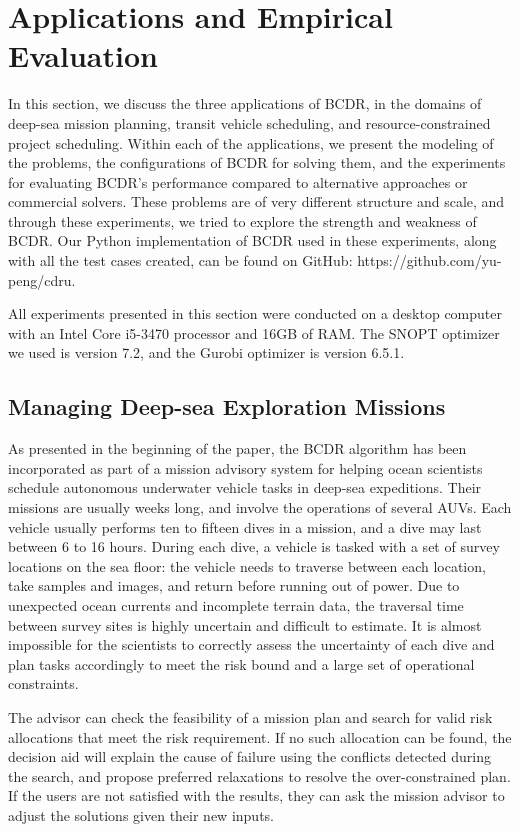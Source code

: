 \documentclass[jair,twoside,11pt,theapa]{article}
\begin{document}
\section{Applications and Empirical Evaluation}


In this section, we discuss the three applications of BCDR, in the domains of
deep-sea mission planning, transit vehicle scheduling, and resource-constrained
project scheduling. Within each of the applications, we present the modeling of
the problems, the configurations of BCDR for solving them, and the experiments
for evaluating BCDR's performance compared to alternative approaches or
commercial solvers. These problems are of very different structure and scale,
and through these experiments, we tried to explore the strength and weakness of
BCDR. Our Python implementation of BCDR used in these experiments, along with
all the test cases created, can be found on GitHub: https://github.com/yu-peng/cdru.


All experiments presented in this section were conducted on a desktop computer
with an Intel Core i5-3470 processor and 16GB of RAM. The SNOPT optimizer we used
is version 7.2, and the Gurobi optimizer is version 6.5.1.


\subsection{Managing Deep-sea Exploration Missions}


As presented in the beginning of the paper, the BCDR algorithm has been
incorporated as part of a mission advisory system for helping ocean scientists
schedule autonomous underwater vehicle tasks in deep-sea expeditions. Their
missions are usually weeks long, and involve the operations of several
AUVs. Each vehicle usually performs ten to fifteen dives in a
mission, and a dive may last between 6 to 16 hours. During each dive, a
vehicle is tasked with a set of survey locations on the sea floor: the vehicle needs
to traverse between each location, take samples and images, and return before running
out of power. Due to unexpected ocean currents and incomplete terrain data, the
traversal time between survey sites is highly uncertain and difficult to
estimate. It is almost impossible for the scientists to correctly assess the
uncertainty of each dive and plan tasks accordingly to meet the risk bound and a
large set of operational constraints.


The advisor can check the feasibility
of a mission plan and search for valid risk allocations that meet the risk
requirement. If no such allocation can be found, the decision aid will explain
the cause of failure using the conflicts detected during the search, and propose
preferred relaxations to resolve the over-constrained plan. If the users are not
satisfied with the results, they can ask the mission advisor to adjust the
solutions given their new inputs. 
\end{document}
